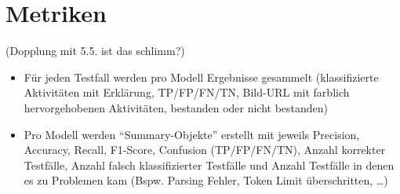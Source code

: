 \section{Metriken}\label{sec:metriken}

(Dopplung mit 5.5. ist das schlimm?)

\begin{itemize}
    \item Für jeden Testfall werden pro Modell Ergebnisse gesammelt (klassifizierte Aktivitäten mit Erklärung, TP/FP/FN/TN, Bild-URL mit farblich hervorgehobenen Aktivitäten, bestanden oder nicht bestanden)
    \item Pro Modell werden ``Summary-Objekte'' erstellt mit jeweils Precision, Accuracy, Recall, F1-Score, Confusion (TP/FP/FN/TN), Anzahl korrekter Testfälle, Anzahl falsch klassifizierter Testfälle und Anzahl Testfälle in denen es zu Problemen kam (Bspw. Parsing Fehler, Token Limit überschritten, \ldots)
\end{itemize}